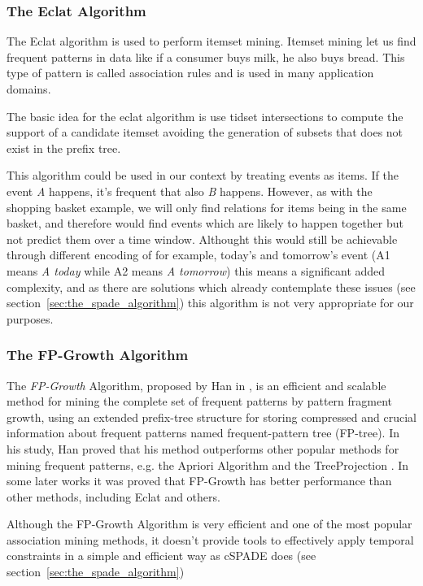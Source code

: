 \subsubsection{The Eclat Algorithm}
The Eclat algorithm \cite{zaki1997new} is used to perform itemset mining. Itemset mining let us find frequent patterns in data like if a consumer buys milk, he also buys bread. This type of pattern is called association rules and is used in many application domains.

The basic idea for the eclat algorithm is use tidset intersections to compute the support of a candidate itemset avoiding the generation of subsets that does not exist in the prefix tree.

This algorithm could be used in our context by treating events as items. If the event \emph{A} happens, it's frequent that also \emph{B} happens. However, as with the shopping basket example, we will only find relations for items being in the same basket, and therefore would find events which are likely to happen together but not predict them over a time window. Althought this would still be achievable through different encoding of for example, today's and tomorrow's event (A1 means \emph{A today} while A2 means \emph{A tomorrow}) this means a significant added complexity, and as there are solutions which already contemplate these issues (see section~\ref{sec:the_spade_algorithm}) this algorithm is not very appropriate for our purposes.

\subsubsection{The FP-Growth Algorithm}
The \emph{FP-Growth} Algorithm, proposed by Han in \cite{han2000mining}, is an efficient and scalable method for mining the complete set of frequent patterns by pattern fragment growth, using an extended prefix-tree structure for storing compressed and crucial information about frequent patterns named frequent-pattern tree (FP-tree). In his study, Han proved that his method outperforms other popular methods for mining frequent patterns, e.g. the Apriori Algorithm \cite{agrawal1994fast} and the TreeProjection \cite{agarwal2001tree}. In some later works \cite{kumar2010implementation} it was proved that FP-Growth has better performance than other methods, including Eclat \cite{zaki1997new} and others.

Although the FP-Growth Algorithm is very efficient and one of the most popular association mining methods, it doesn't provide tools to effectively apply temporal constraints in a simple and efficient way as cSPADE does (see section~\ref{sec:the_spade_algorithm})

